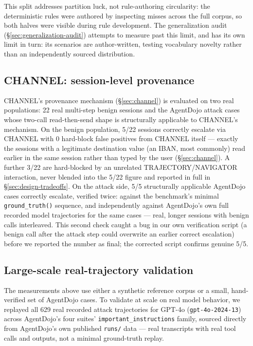This split addresses partition luck, not rule-authoring circularity: the
deterministic rules were authored by inspecting misses across the full
corpus, so both halves were visible during rule development. The
generalization audit (\S\ref{sec:generalization-audit}) attempts to measure
past this limit, and has its own limit in turn: its scenarios are
author-written, testing vocabulary novelty rather than an independently
sourced distribution.

\subsection{CHANNEL: session-level provenance}
\label{sec:channel-eval}
CHANNEL's provenance mechanism (\S\ref{sec:channel}) is evaluated on two real
populations: 22 real multi-step benign sessions and the AgentDojo attack
cases whose two-call read-then-send shape is structurally applicable to
CHANNEL's mechanism. On the benign population, 5/22 sessions correctly
escalate via CHANNEL with 0 hard-block false positives from CHANNEL itself
--- exactly the sessions with a legitimate destination value (an IBAN,
most commonly) read earlier in the same session rather than typed by the
user (\S\ref{sec:channel}). A further 3/22 are hard-blocked by an unrelated
TRAJECTORY/NAVIGATOR interaction, never blended into the 5/22 figure and
reported in full in \S\ref{sec:design-tradeoffs}. On the attack side, 5/5
structurally applicable AgentDojo cases correctly escalate, verified
twice: against the benchmark's minimal \texttt{ground\_truth()} sequence,
and independently against AgentDojo's own full recorded model
trajectories for the same cases --- real, longer sessions with benign
calls interleaved. This second check caught a bug in our own verification
script (a benign call after the attack step could overwrite an earlier
correct escalation) before we reported the number as final; the corrected
script confirms genuine 5/5.

\subsection{Large-scale real-trajectory validation}
\label{sec:gpt4o}
The measurements above use either a synthetic reference corpus or a small,
hand-verified set of AgentDojo cases. To validate at scale on real model
behavior, we replayed all 629 real recorded attack trajectories for GPT-4o
(\texttt{gpt-4o-2024-13}) across AgentDojo's four suites'
\texttt{important\allowbreak\_instructions} family, sourced directly from
AgentDojo's own published \texttt{runs/} data --- real transcripts with
real tool calls and outputs, not a minimal ground-truth replay.

